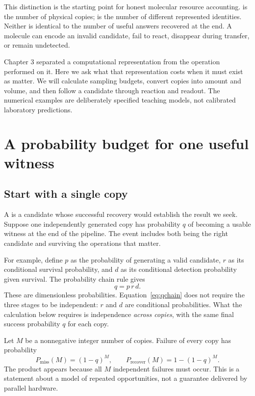 This distinction is the starting point for honest molecular resource accounting.  is the number of physical copies;  is the number of different represented identities. Neither is identical to the number of useful answers recovered at the end. A molecule can encode an invalid candidate, fail to react, disappear during transfer, or remain undetected.

Chapter 3 separated a computational representation from the operation performed on it. Here we ask what that representation costs when it must exist as matter. We will calculate sampling budgets, convert copies into amount and volume, and then follow a candidate through reaction and readout. The numerical examples are deliberately specified teaching models, not calibrated laboratory predictions.

\section{A probability budget for one useful witness}

\subsection{Start with a single copy}

A  is a candidate whose successful recovery would establish the result we seek. Suppose one independently generated copy has probability $q$ of becoming a usable witness at the end of the pipeline. The event includes both being the right candidate and surviving the operations that matter.

For example, define $p$ as the probability of generating a valid candidate, $r$ as its conditional survival probability, and $d$ as its conditional detection probability given survival. The probability chain rule gives
\begin{equation}
q=p\,r\,d. \label{eq:qchain}
\end{equation}
These are dimensionless probabilities. Equation~\ref{eq:qchain} does not require the three stages to be independent: $r$ and $d$ are conditional probabilities. What the calculation below requires is independence \emph{across copies}, with the same final success probability $q$ for each copy.

Let $M$ be a nonnegative integer number of copies. Failure of every copy has probability
\begin{equation}
P_{\mathrm{miss}}(M)=(1-q)^M,\qquad
P_{\mathrm{recover}}(M)=1-(1-q)^M. \label{eq:miss}
\end{equation}
The product appears because all $M$ independent failures must occur. This is a statement about a model of repeated opportunities, not a guarantee delivered by parallel hardware.

